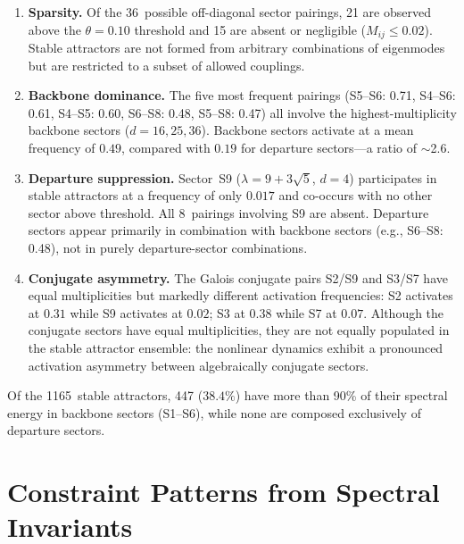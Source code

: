 \documentclass[12pt,a4paper]{article}
\begin{document}
\begin{enumerate}[nosep]
\item \textbf{Sparsity.}
  Of the 36~possible off-diagonal sector pairings, 21 are observed
  above the $\theta = 0.10$ threshold and 15 are absent or
  negligible ($M_{ij} \leq 0.02$).  Stable attractors are not formed
  from arbitrary combinations of eigenmodes but are restricted to a
  subset of allowed couplings.

\item \textbf{Backbone dominance.}
  The five most frequent pairings (S5--S6: 0.71, S4--S6: 0.61,
  S4--S5: 0.60, S6--S8: 0.48, S5--S8: 0.47) all involve the
  highest-multiplicity backbone sectors ($d = 16, 25, 36$).
  Backbone sectors activate at a mean frequency of $0.49$, compared
  with $0.19$ for departure sectors---a ratio of $\sim$2.6.

\item \textbf{Departure suppression.}
  Sector~S9 ($\lambda = 9 + 3\sqrt{5}$, $d = 4$) participates in
  stable attractors at a frequency of only $0.017$ and co-occurs
  with no other sector above threshold.  All 8~pairings involving
  S9 are absent.  Departure sectors appear primarily in combination
  with backbone sectors (e.g., S6--S8: 0.48), not in purely
  departure-sector combinations.

\item \textbf{Conjugate asymmetry.}
  The Galois conjugate pairs S2/S9 and S3/S7 have equal
  multiplicities but markedly different activation frequencies:
  S2 activates at $0.31$ while S9 activates at $0.02$; S3 at
  $0.38$ while S7 at $0.07$.  Although the conjugate sectors have equal multiplicities, they
  are not equally populated in the stable attractor ensemble: the
  nonlinear dynamics exhibit a pronounced activation asymmetry
  between algebraically conjugate sectors.
\end{enumerate}

\noindent Of the 1165~stable attractors, 447 ($38.4\%$) have more
than 90\% of their spectral energy in backbone sectors (S1--S6),
while none are composed exclusively of departure sectors.


\section{Constraint Patterns from Spectral Invariants}
\label{sec:invariants}
\end{document}
